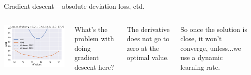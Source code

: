\documentclass[aspectratio=169]{beamer}
\begin{document}
\begin{frame}{Gradient descent -- absolute deviation loss, ctd.}

\begin{columns}
	\includegraphics[width=\textwidth]{mae_vs_mse}


What's the problem with doing gradient descent here?

\vspace{5mm}

\pause

The derivative does not go to zero at the optimal value.  

\vspace{5mm}

So once the solution is close, it won't converge, unless...\pause we use a dynamic learning rate.
\end{columns}

\end{frame}
\end{document}
